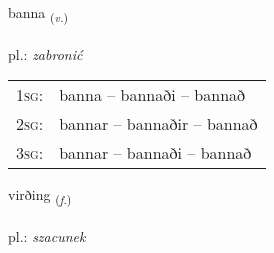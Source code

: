\documentclass[frontgrid, backgrid]{flacards}\usepackage[]{graphicx}\usepackage[]{xcolor}
\begin{document}
\renewcommand{\flhead}{\vskip5pt \fboxsep=0pt {\small\bfseries\footnotesize Sagnorð | Verb}}
\renewcommand{\fcfoot}{\vskip5pt \fboxsep=0pt \hspace{2pt}{\small\bfseries\footnotesize 2K}}

\renewcommand{\blhead}{\vskip5pt {\small\bfseries\footnotesize Sagnorð | Verb }}
\renewcommand{\bcfoot}{\vskip5pt \hspace{2pt}{\small\bfseries\footnotesize 2K}}


{banna \small{\textsubscript{(\textit{v.})}} \\[1ex] %
\textphonetic{[pana]} \\
pl.: \emph{zabronić} \\  [2ex]
\renewcommand*{\arraystretch}{0.8}
\begin{tabular}{p{1cm}l}
\textsc{1sg}: & banna -- bannaði -- bannað \\ 
\textsc{2sg}: & bannar -- bannaðir -- bannað \\ 
\textsc{3sg}: & bannar -- bannaði -- bannað \\ 
\end{tabular}
}

\renewcommand{\flhead}{\vskip5pt \fboxsep=0pt {\small\bfseries\footnotesize Nafnorð | Noun}}
\renewcommand{\fcfoot}{\vskip5pt \fboxsep=0pt \hspace{2pt}{\small\bfseries\footnotesize 2K}}

\renewcommand{\blhead}{\vskip5pt {\small\bfseries\footnotesize Nafnorð | Noun }}
\renewcommand{\bcfoot}{\vskip5pt \hspace{2pt}{\small\bfseries\footnotesize 2K}}


{virðing \small{\textsubscript{(\textit{f.})}} \\[1ex] %
\textphonetic{[vɪrðiŋk]} \\
pl.: \emph{szacunek} \\  [2ex]
\renewcommand*{\arraystretch}{0.8}
}
\end{document}
